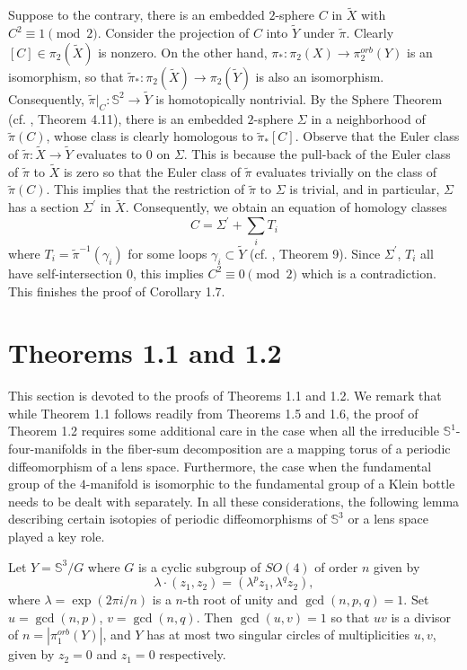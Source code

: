 \documentclass[11pt]{amsart}
\theoremstyle{plain}
\numberwithin{theorem}{section}
\theoremstyle{definition}
\begin{document}
Suppose to the contrary, there is an embedded $2$-sphere $C$ in $\tilde{X}$ with 
$C^2\equiv 1\pmod{2}$. Consider the projection of $C$ into $\tilde{Y}$ under $\tilde{\pi}$. 
Clearly $[C]\in \pi_2(\tilde{X})$ is nonzero. On the other hand, 
$\pi_\ast: \pi_2(X)\rightarrow \pi_2^{orb}(Y)$ is an isomorphism, so that 
$\tilde{\pi}_\ast: \pi_2(\tilde{X})\rightarrow \pi_2(\tilde{Y})$ is also an isomorphism. 
Consequently, $\tilde{\pi}|_{C}: {{\mathbb S}}^2\rightarrow \tilde{Y}$ is homotopically nontrivial.
By the Sphere Theorem (cf. \cite{Hem}, Theorem 4.11), there is an embedded $2$-sphere 
$\Sigma$ in a neighborhood of $\tilde{\pi}(C)$, whose class is clearly homologous 
to $\tilde{\pi}_\ast [C]$.  Observe that the Euler class of $\tilde{\pi}:\tilde{X}\rightarrow \tilde{Y}$ evaluates to $0$ on $\Sigma$. 
This is because the pull-back of the Euler class of $\tilde{\pi}$ to $\tilde{X}$ is zero so that the Euler 
class of $\tilde{\pi}$ evaluates trivially on the class of $\tilde{\pi}(C)$. This implies that the restriction 
of $\tilde{\pi}$ to $\Sigma$ is trivial, and in particular, $\Sigma$ has a section $\Sigma^\prime$ in 
$\tilde{X}$. Consequently, we obtain an equation of homology classes
$$
C=\Sigma^\prime+ \sum_i T_i
$$
where $T_i=\tilde{\pi}^{-1}(\gamma_i)$ for some loops $\gamma_i\subset \tilde{Y}$ (cf. \cite{Bald},
Theorem 9). Since $\Sigma^\prime$, $T_i$ all have self-intersection $0$, this implies 
$C^2\equiv 0 \pmod{2}$ which is a contradiction. This finishes the proof of Corollary 1.7. 

\section{Theorems 1.1 and 1.2}

This section is devoted to the proofs of Theorems 1.1 and 1.2. We remark that while Theorem 1.1 follows 
readily from Theorems 1.5 and 1.6, the proof of Theorem 1.2 requires some additional care in the case
when all the irreducible ${{\mathbb S}}^1$-four-manifolds in the fiber-sum decomposition are a mapping torus of
a periodic diffeomorphism of a lens space. Furthermore, the case when the fundamental group 
of the $4$-manifold is isomorphic
to the fundamental group of a Klein bottle needs to be dealt with separately. In all these considerations,
the following lemma describing certain isotopies of periodic diffeomorphisms of ${{\mathbb S}}^3$ or a lens space
played a key role. 

Let $Y={{\mathbb S}}^3/G$ where $G$ is a cyclic subgroup of $SO(4)$ of order $n$ given by 
$$
\lambda \cdot (z_1,z_2)=(\lambda^{p}z_1,\lambda^{q}z_2), 
$$
where $\lambda=\exp(2\pi i/n)$ is a $n$-th root of unity and $\gcd(n,p,q)=1$. 
Set $u=\gcd(n,p)$, $v=\gcd(n,q)$. Then $\gcd(u,v)=1$ so that $uv$ 
is a divisor of $n=|\pi_1^{orb}(Y)|$, and $Y$ has at most two singular circles 
of multiplicities $u,v$, given by $z_2=0$ and $z_1=0$ respectively. 
\end{document}
